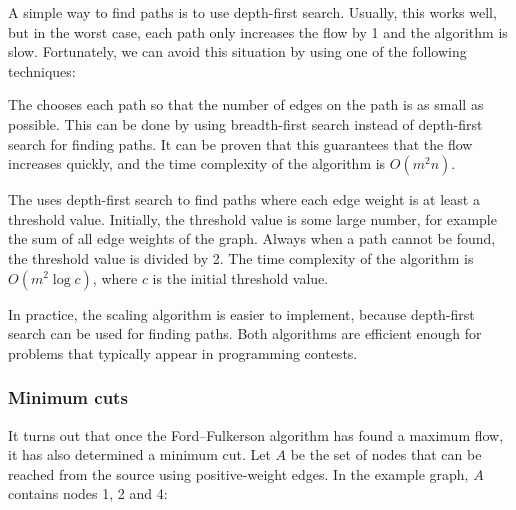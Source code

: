 A simple way to find paths is to use depth-first search.
Usually, this works well, but in the worst case,
each path only increases the flow by 1
and the algorithm is slow.
Fortunately, we can avoid this situation
by using one of the following techniques:


The  \cite{edm72}
chooses each path so that the number of edges
on the path is as small as possible.
This can be done by using breadth-first search
instead of depth-first search for finding paths.
It can be proven that this guarantees that
the flow increases quickly, and the time complexity
of the algorithm is $O(m^2 n)$.


The  \cite{ahu91} uses depth-first
search to find paths where each edge weight is
at least a threshold value.
Initially, the threshold value is
some large number, for example the sum of all
edge weights of the graph.
Always when a path cannot be found,
the threshold value is divided by 2.
The time complexity of the algorithm is $O(m^2 \log c)$,
where $c$ is the initial threshold value.

In practice, the scaling algorithm is easier to implement,
because depth-first search can be used for finding paths.
Both algorithms are efficient enough for problems
that typically appear in programming contests.

\subsubsection{Minimum cuts}


It turns out that once the Ford–Fulkerson algorithm
has found a maximum flow,
it has also determined a minimum cut.
Let $A$ be the set of nodes
that can be reached from the source
using positive-weight edges.
In the example graph, $A$ contains nodes 1, 2 and 4:

